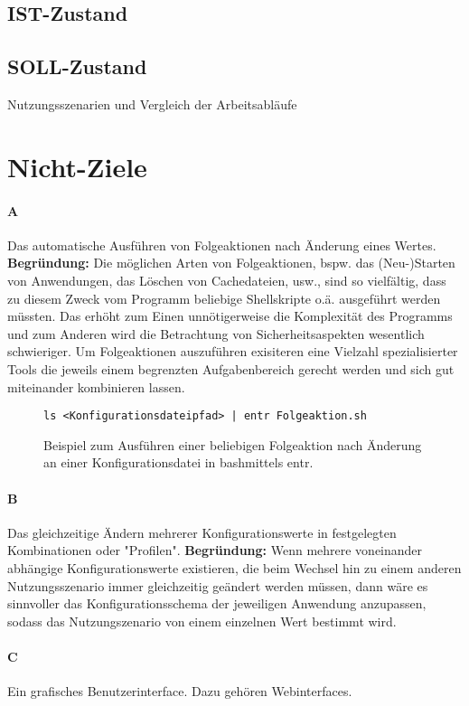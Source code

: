 \documentclass[a4paper,11pt]{article}
\begin{document}
\subsection{IST-Zustand}
\subsection{SOLL-Zustand}

\begin{center}
	\begin{table}[h]
		\caption{Nutzungsszenarien und Vergleich der Arbeitsabläufe}
	\end{table}
\end{center}

\section{Nicht-Ziele}
\paragraph{A}
Das automatische Ausführen von Folgeaktionen nach Änderung eines Wertes. \textbf{Begründung:}
Die möglichen Arten von Folgeaktionen, bspw. das (Neu-)Starten von Anwendungen,
das Löschen von Cachedateien, usw., sind so vielfältig, dass zu diesem Zweck vom
Programm beliebige Shellskripte o.ä. ausgeführt werden müssten. Das erhöht zum Einen
unnötigerweise die Komplexität des Programms und zum Anderen wird die Betrachtung von
Sicherheitsaspekten wesentlich schwieriger. Um Folgeaktionen auszuführen exisiteren
eine Vielzahl spezialisierter Tools die jeweils einem begrenzten Aufgabenbereich
gerecht werden und sich gut miteinander kombinieren lassen.

\begin{figure}[!ht]
	\caption[cdba]{Beispiel zum Ausführen einer beliebigen Folgeaktion nach
		Änderung an einer Konfigurationsdatei in bash\footnotemark mittels entr.\footnotemark}
	\begin{verbatim}
ls <Konfigurationsdateipfad> | entr Folgeaktion.sh
\end{verbatim}
\end{figure}

\paragraph{B}
Das gleichzeitige Ändern mehrerer Konfigurationswerte in festgelegten Kombinationen
oder "Profilen". \textbf{Begründung:} Wenn mehrere voneinander abhängige Konfigurationswerte
existieren, die beim Wechsel hin zu einem anderen Nutzungsszenario immer gleichzeitig
geändert werden müssen, dann wäre es sinnvoller das Konfigurationsschema der jeweiligen
Anwendung anzupassen, sodass das Nutzungszenario von einem einzelnen Wert bestimmt wird.

\paragraph{C}
Ein grafisches Benutzerinterface. Dazu gehören Webinterfaces.
\end{document}
